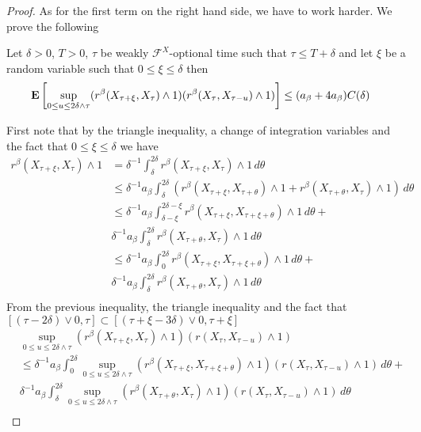 \begin{proof}
As for the first term on the right hand side, we have to work harder.  We prove the following
\begin{clm}Let $\delta>0$, $T>0$, $\tau$ be weakly $\mathcal{F}^X$-optional time such that $\tau \leq T+\delta$ and let $\xi$ be a random variable such that $0 \leq \xi \leq \delta$ then
\begin{align*}
\textbf{E}\left[\sup_{0\leq u \leq 2\delta \wedge \tau} (r^\beta(X_{\tau + \xi}, X_\tau) \wedge 1) (r^\beta(X_{\tau}, X_{\tau-u}) \wedge 1)\right] &\leq (a_\beta + 4a_\beta) C(\delta)
\end{align*}
\end{clm}
First note that by the triangle inequality, a change of integration variables and the fact that $0 \leq \xi \leq \delta$ we have
\begin{align*}
r^\beta(X_{\tau + \xi}, X_\tau) \wedge 1 
&= \delta^{-1} \int_\delta^{2\delta} r^\beta(X_{\tau + \xi}, X_\tau) \wedge 1 \, d\theta \\
&\leq \delta^{-1} a_\beta \int_\delta^{2\delta} (r^\beta(X_{\tau + \xi}, X_{\tau+\theta}) \wedge 1 + r^\beta(X_{\tau + \theta}, X_{\tau}) \wedge 1 ) \, d\theta \\
&\leq \delta^{-1} a_\beta \int_{\delta-\xi}^{2\delta-\xi} r^\beta(X_{\tau + \xi}, X_{\tau+\xi + \theta}) \wedge 1 \, d\theta + \\
& \delta^{-1} a_\beta \int_\delta^{2\delta} r^\beta(X_{\tau + \theta}, X_{\tau}) \wedge 1  \, d\theta \\
&\leq \delta^{-1} a_\beta \int_{0}^{2\delta} r^\beta(X_{\tau + \xi}, X_{\tau+\xi + \theta}) \wedge 1 \, d\theta + \\
& \delta^{-1} a_\beta \int_\delta^{2\delta} r^\beta(X_{\tau + \theta}, X_{\tau}) \wedge 1  \, d\theta \\
\end{align*}
From the previous inequality, the triangle inequality and the fact that $[(\tau-2\delta) \vee 0, \tau] \subset [(\tau+\xi-3\delta) \vee 0, \tau+\xi]$
\begin{align*}
&\sup_{0 \leq u \leq 2\delta \wedge \tau}  (r^\beta(X_{\tau + \xi}, X_\tau) \wedge 1)(r(X_\tau, X_{\tau-u})\wedge 1) \\
&\leq \delta^{-1} a_\beta \int_{0}^{2\delta} \sup_{0 \leq u \leq 2\delta \wedge \tau} ( r^\beta(X_{\tau + \xi}, X_{\tau+\xi + \theta}) \wedge 1) (r(X_\tau, X_{\tau-u})\wedge 1) \, d\theta + \\
& \delta^{-1} a_\beta \int_\delta^{2\delta} \sup_{0 \leq u \leq 2\delta \wedge \tau} (r^\beta(X_{\tau + \theta}, X_{\tau}) \wedge 1)  (r(X_\tau, X_{\tau-u})\wedge 1) \, d\theta \\

\end{align*}
\end{proof}
